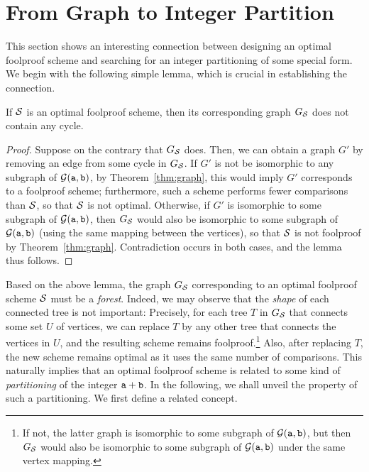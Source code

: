 
\section{From Graph to Integer Partition}
This section shows an interesting connection between designing an optimal foolproof scheme and 
searching for an integer partitioning of some special form.  
We begin with the following simple lemma, which is crucial in establishing the connection.

\begin{lemma} \label{lem:no-cycle}
If  ${\cal S}$ is an optimal foolproof scheme, then its corresponding graph $G_{\cal S}$ does 
not contain any cycle.  
\end{lemma}
\begin{proof}
Suppose on the contrary that $G_{\cal S}$ does.  Then,  we can obtain a graph $G'$ by removing an edge from some cycle in $G_{\cal S}$.  If $G'$ is not be isomorphic to any subgraph of ${\cal G}(\mathtt{a},\mathtt{b})$, by Theorem~\ref{thm:graph}, this would imply $G'$ corresponds to a foolproof scheme;  furthermore, such a scheme performs fewer comparisons than ${\cal S}$, 
so that ${\cal S}$ is not optimal.   Otherwise, if $G'$ is isomorphic to some subgraph of ${\cal G}(\mathtt{a},\mathtt{b})$, then $G_{\cal S}$ would also be isomorphic to some subgraph of ${\cal G}(\mathtt{a},\mathtt{b})$ (using the same mapping between the vertices), 
so that ${\cal S}$ is not foolproof by Theorem~\ref{thm:graph}.  
Contradiction occurs in both cases, and the lemma thus follows. 
\end{proof}

Based on the above lemma, the graph $G_{\cal S}$ corresponding to an optimal foolproof scheme ${\cal S}$ must be a \emph{forest}.  Indeed, we may observe that the \emph{shape} of each connected tree is not important:  
Precisely, for each tree $T$ in $G_{\cal S}$ that connects some set $U$ of vertices, we can replace $T$ 
by any other tree that connects the vertices in $U$, and the resulting scheme remains foolproof.\footnote{%
If not, the latter graph is isomorphic to some subgraph of ${\cal G}(\mathtt{a},\mathtt{b})$, but then $G_{\cal S}$ would also be
isomorphic to some subgraph of ${\cal G}(\mathtt{a},\mathtt{b})$ under the same vertex mapping.}  
Also, after replacing $T$, the new scheme remains optimal as it uses the same number of comparisons.
This naturally implies that an optimal foolproof scheme is related to some kind of \emph{partitioning} 
of the integer $\mathtt{a} + \mathtt{b}$.  In the following, we shall unveil the property of such a partitioning.  
We first define a related concept.

